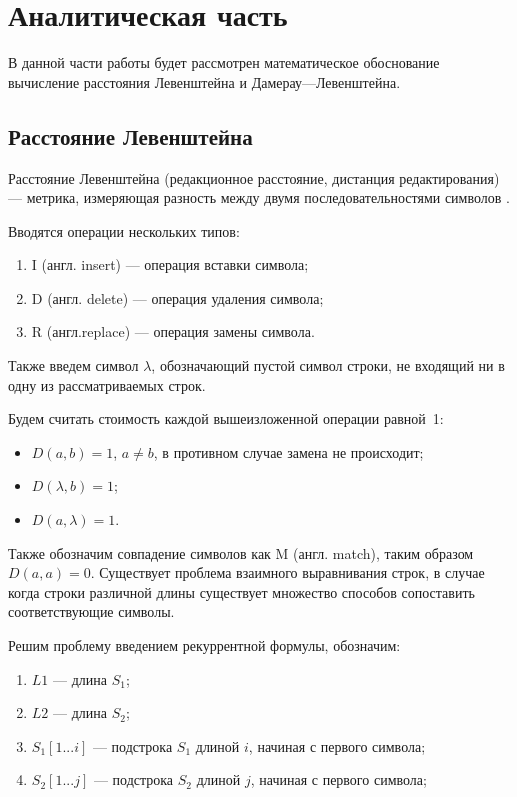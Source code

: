 \chapter{Аналитическая часть}
В данной части работы будет рассмотрен математическое обоснование
вычисление расстояния Левенштейна и Дамерау---Левенштейна.

\section{Расстояние Левенштейна}


Расстояние Левенштейна (редакционное расстояние, дистанция редактирования) --- метрика, измеряющая разность между двумя последовательностями символов \cite{levenshtein}.

Вводятся операции нескольких типов:
\begin{enumerate}
	\item I (англ. insert) --- операция вставки символа;
	\item D (англ. delete) --- операция удаления символа;
	\item R (англ.replace) --- операция замены символа.
\end{enumerate}
Также введем символ $\lambda$, обозначающий пустой символ строки, не входящий ни в одну из рассматриваемых строк.

Будем считать стоимость каждой вышеизложенной операции равной~1:
\begin{itemize}[label=---]
	\item $D(a, b) = 1$, $a \neq b$, в противном случае замена не происходит;
	\item $D(\lambda, b) = 1$;
	\item $D(a, \lambda) = 1$.
\end{itemize}


Также обозначим совпадение символов как M (англ. match), таким образом $D(a,a) = 0$.
Существует  проблема взаимного выравнивания строк, в случае когда строки различной длины существует множество способов сопоставить соответствующие символы.

Решим проблему введением рекуррентной формулы, обозначим:
\begin{enumerate}
	\item $L1$ --- длина $S_{1}$;
	\item $L2$ --- длина $S_{2}$;
	\item $S_{1}[1...i]$ --- подстрока $S_{1}$ длиной $i$, начиная с первого символа;
	\item $S_{2}[1...j]$ --- подстрока $S_{2}$ длиной $j$, начиная с первого символа;
\end{enumerate}




